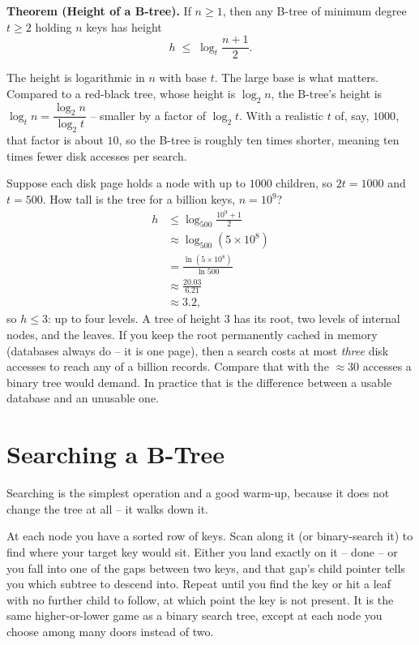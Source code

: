 \begin{formalbox}
\textbf{Theorem (Height of a B-tree).} If $n \ge 1$, then any B-tree of minimum
degree $t \ge 2$ holding $n$ keys has height
\[
h \;\le\; \log_t \frac{n+1}{2}.
\]
\end{formalbox}

\begin{focusbox}
The height is logarithmic in $n$ with base $t$. The large base is what matters.
Compared to a red-black tree, whose height is $\log_2 n$, the B-tree's height is
$\log_t n = \dfrac{\log_2 n}{\log_2 t}$ -- smaller by a factor of $\log_2 t$. With a
realistic $t$ of, say, $1000$, that factor is about $10$, so the B-tree is roughly
ten times shorter, meaning ten times fewer disk accesses per search.
\end{focusbox}

\begin{example}\label{ch18:ex-height-numbers}
Suppose each disk page holds a node with up to $1000$ children, so $2t = 1000$ and
$t = 500$. How tall is the tree for a billion keys, $n = 10^9$?
\begin{align*}
h &\le \log_{500}\frac{10^9 + 1}{2} \\
  &\approx \log_{500}(5\times 10^8) \\
  &= \frac{\ln(5\times 10^8)}{\ln 500} \\
  &\approx \frac{20.03}{6.21} \\
  &\approx 3.2,
\end{align*}
so $h \le 3$: up to four levels. A tree of height $3$ has its root, two levels of
internal nodes, and the leaves. If you keep the root permanently cached in memory
(databases always do -- it is one page), then a search costs at most
\emph{three} disk accesses to reach any of a billion records. Compare that with the
$\approx 30$ accesses a binary tree would demand. In practice that is the
difference between a usable database and an unusable one.
\end{example}

\section{Searching a B-Tree}

Searching is the simplest operation and a good warm-up, because it does not
change the tree at all -- it walks down it.

\begin{intuitionbox}
At each node you have a sorted row of keys. Scan along it (or binary-search it) to
find where your target key would sit. Either you land exactly on it -- done -- or
you fall into one of the gaps between two keys, and that gap's child pointer tells
you which subtree to descend into. Repeat until you find the key or hit a leaf with
no further child to follow, at which point the key is not present. It is the
same higher-or-lower game as a binary search tree, except at each node you choose
among many doors instead of two.
\end{intuitionbox}

